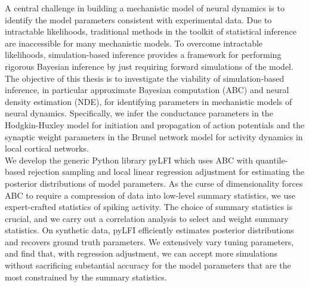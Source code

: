 A central challenge in building a mechanistic model of neural dynamics is to identify the model parameters consistent with experimental data. Due to intractable likelihoods, traditional methods in the toolkit of statistical inference are inaccessible for many mechanistic models. To overcome intractable likelihoods, simulation-based inference provides a framework for performing rigorous Bayesian inference by just requiring forward simulations of the model. The objective of this thesis is to investigate the viability of simulation-based inference, in particular approximate Bayesian computation (ABC) and neural density estimation (NDE), for identifying parameters in mechanistic models of neural dynamics. Specifically, we infer the conductance parameters in the Hodgkin-Huxley model for initiation and propagation of action potentials and the synaptic weight parameters in the Brunel network model for activity dynamics in local cortical networks. 
\\
\indent We develop the generic Python library pyLFI which uses ABC with quantile-based rejection sampling and local linear regression adjustment for estimating the posterior distributions of model parameters. As the curse of dimensionality forces ABC to require a compression of data into low-level summary statistics, we use expert-crafted statistics of spiking activity. The choice of summary statistics is crucial, and we carry out a correlation analysis to select and weight summary statistics. On synthetic data, pyLFI efficiently estimates posterior distributions and recovers ground truth parameters. We extensively vary tuning parameters, and find that, with regression adjustment, we can accept more simulations without sacrificing substantial accuracy for the model parameters that are the most constrained by the summary statistics. %
